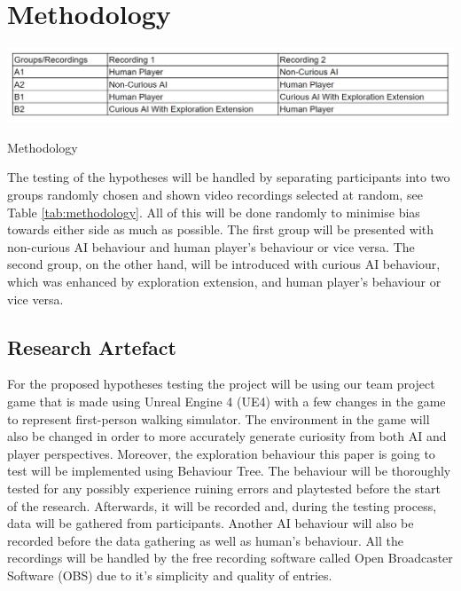 \documentclass[journal]{IEEEtran}
\begin{document}
\section{Methodology}
\begin{table}
	\includegraphics[width=\linewidth]{MethodologyTable.PNG}
	\caption{Methodology}
	\label{tab:methodology}
\end{table}
The testing of the hypotheses will be handled by separating participants into two groups randomly chosen and shown video recordings selected at random, see Table \ref{tab:methodology}. All of this will be done randomly to minimise bias towards either side as much as possible. The first group will be presented with non-curious AI behaviour and human player's behaviour or vice versa. The second group, on the other hand, will be introduced with curious AI behaviour, which was enhanced by exploration extension, and human player's behaviour or vice versa. 

\subsection{Research Artefact}
For the proposed hypotheses testing the project will be using our team project game that is made using Unreal Engine 4 (UE4) with a few changes in the game to represent first-person walking simulator. The environment in the game will also be changed in order to more accurately generate curiosity from both AI and player perspectives. Moreover, the exploration behaviour this paper is going to test will be implemented using Behaviour Tree. The behaviour will be thoroughly tested for any possibly experience ruining errors and playtested before the start of the research. Afterwards, it will be recorded and, during the testing process, data will be gathered from participants. Another AI behaviour will also be recorded before the data gathering as well as human's behaviour. All the recordings will be handled by the free recording software called Open Broadcaster Software (OBS) due to it's simplicity and quality of entries.
\end{document}
